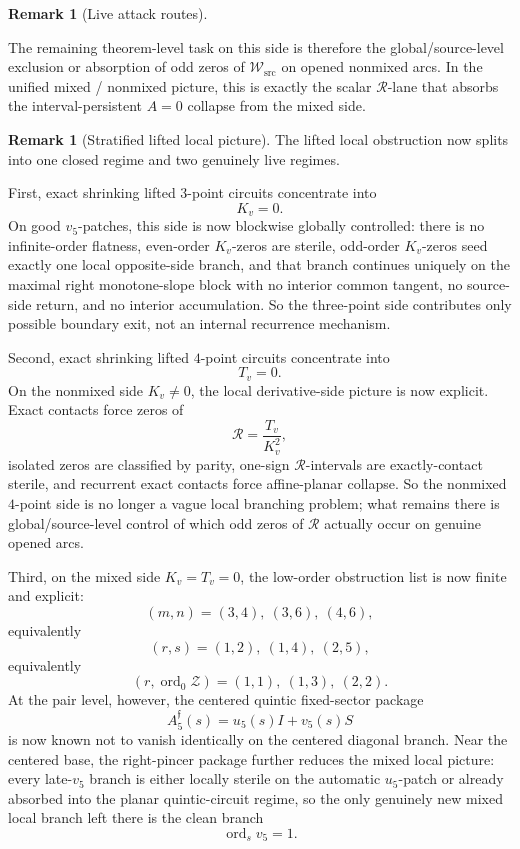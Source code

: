 \documentclass[11pt,a4paper]{amsart}
\theoremstyle{plain}
\theoremstyle{definition}
\newtheorem{remark}[theorem]{Remark}
\begin{document}
\begin{remark}[Live attack routes]
\begin{enumerate}
The remaining theorem-level task on this side is therefore the
global/source-level exclusion or absorption of odd zeros of
$\mathcal W_{\mathrm{src}}$ on opened nonmixed arcs. In the unified mixed /
nonmixed picture, this is exactly the scalar $\mathcal R$-lane that absorbs the
interval-persistent $A=0$ collapse from the mixed side.
\end{enumerate}
\end{remark}

\begin{remark}[Stratified lifted local picture]
\label{rem:wip-stratified-lifted-local-picture}
The lifted local obstruction now splits into one closed regime and two genuinely
live regimes.

First, exact shrinking lifted $3$-point circuits concentrate into
\[
K_v=0.
\]
On good $v_5$-patches, this side is now blockwise globally controlled: there is no
infinite-order flatness, even-order $K_v$-zeros are sterile, odd-order
$K_v$-zeros seed exactly one local opposite-side branch, and that branch
continues uniquely on the maximal right monotone-slope block with no interior
common tangent, no source-side return, and no interior accumulation. So the
three-point side contributes only possible boundary exit, not an internal
recurrence mechanism.

Second, exact shrinking lifted $4$-point circuits concentrate into
\[
T_v=0.
\]
On the nonmixed side $K_v\neq 0$, the local derivative-side picture is now
explicit. Exact contacts force zeros of
\[
\mathcal R=\frac{T_v}{K_v^2},
\]
isolated zeros are classified by parity, one-sign $\mathcal R$-intervals are
exactly-contact sterile, and recurrent exact contacts force affine-planar
collapse. So the nonmixed $4$-point side is no longer a vague local
branching problem; what remains there is global/source-level control of which
odd zeros of $\mathcal R$ actually occur on genuine opened arcs.

Third, on the mixed side $K_v=T_v=0$, the low-order obstruction list is now
finite and explicit:
\[
(m,n)=(3,4),\ (3,6),\ (4,6),
\]
equivalently
\[
(r,s)=(1,2),\ (1,4),\ (2,5),
\]
equivalently
\[
(r,\operatorname{ord}_0\mathcal Z)=(1,1),\ (1,3),\ (2,2).
\]
At the pair level, however, the centered quintic fixed-sector package
\[
A_5^{\mathfrak f}(s)=u_5(s)I+v_5(s)S
\]
is now known not to vanish identically on the centered diagonal branch.
Near the centered base, the right-pincer package further reduces the mixed
local picture: every late-$v_5$ branch is either locally sterile on the
automatic $u_5$-patch or already absorbed into the planar quintic-circuit
regime, so the only genuinely new mixed local branch left there is the clean
branch
\[
\operatorname{ord}_s v_5=1.
\]


\end{remark}
\end{document}
